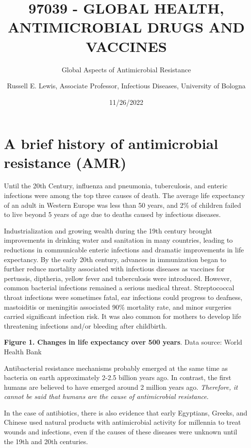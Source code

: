 \documentclass[
]{book}
\title{97039 - GLOBAL HEALTH, ANTIMICROBIAL DRUGS AND VACCINES}
\subtitle{Global Aspects of Antimicrobial Resistance}
\author{Russell E. Lewis, Associate Professor, Infectious Diseases, University of Bologna}
\date{11/26/2022}
\begin{document}
\maketitle

{
\setcounter{tocdepth}{1}
\tableofcontents
}
\hypertarget{a-brief-history-of-antimicrobial-resistance-amr}{%
\section*{A brief history of antimicrobial resistance (AMR)}\label{a-brief-history-of-antimicrobial-resistance-amr}}

Until the 20th Century, influenza and pneumonia, tuberculosis, and enteric infections were among the top three causes of death. The average life expectancy of an adult in Western Europe was less than 50 years, and 2\% of children failed to live beyond 5 years of age due to deaths caused by infectious diseases.

Industrialization and growing wealth during the 19th century brought improvements in drinking water and sanitation in many countries, leading to reductions in communicable enteric infections and dramatic improvements in life expectancy. By the early 20th century, advances in immunization began to further reduce mortality associated with infectious diseases as vaccines for pertussis, diptheria, yellow fever and tuberculosis were introduced. However, common bacterial infections remained a serious medical threat. Streptococcal throat infections were sometimes fatal, ear infections could progress to deafness, mastoiditis or meningitis associated 90\% mortality rate, and minor surgeries carried significant infection risk. It was also common for mothers to develop life threatening infections and/or bleeding after childbirth.

\textbf{Figure 1. Changes in life expectancy over 500 years}. Data source: World Health Bank

Antibacterial resistance mechanisms probably emerged at the same time as bacteria on earth approximately 2-2.5 billion years ago. In contrast, the first humans are believed to have emerged around 2 million years ago. \emph{Therefore, it cannot be said that humans are the cause of antimicrobial resistance}.

In the case of antibiotics, there is also evidence that early Egyptians, Greeks, and Chinese used natural products with antimicrobial activity for millennia to treat wounds and infections, even if the causes of these diseases were unknown until the 19th and 20th centuries.
\end{document}
